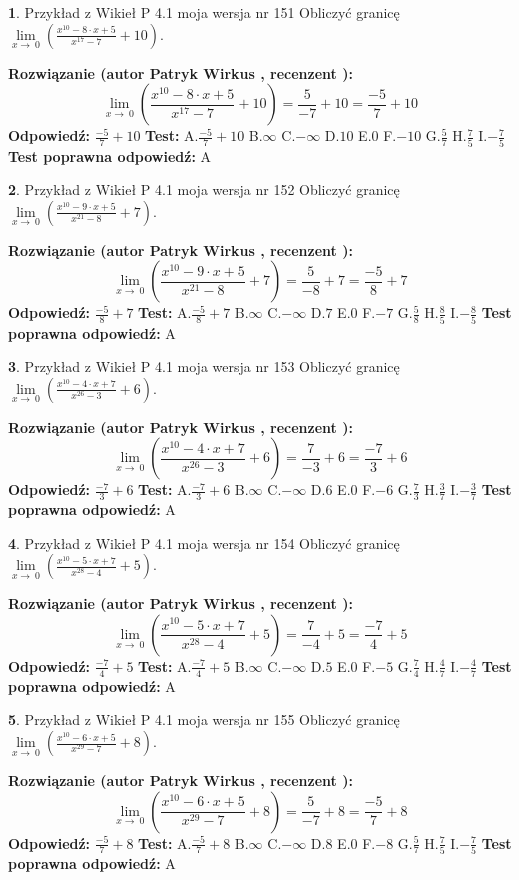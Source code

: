 \documentclass[12pt, a4paper]{article}
\theoremstyle{definition} %
\newtheorem{zad}{}
\newcommand{\zadStart}[1]{\begin{zad}#1\newline}
\newcommand{\zadStop}{\end{zad}}
\newcommand{\rozwStart}[2]{\noindent \textbf{Rozwiązanie (autor #1 , recenzent #2): }\newline}
\newcommand{\rozwStop}{\newline}
\newcommand{\odpStart}{\noindent \textbf{Odpowiedź:}\newline}
\newcommand{\odpStop}{\newline}
\newcommand{\testStart}{\noindent \textbf{Test:}\newline}
\newcommand{\testStop}{\newline}
\newcommand{\kluczStart}{\noindent \textbf{Test poprawna odpowiedź:}\newline}
\newcommand{\kluczStop}{\newline}
\begin{document}
\zadStart{Przykład z Wikieł P 4.1 moja wersja nr 151}
Obliczyć granicę $\lim\limits_{x\to\ 0}(\frac{x^{10}-8 \cdot x +5}{x^{17}-7}+10)$.
\zadStop
\rozwStart{Patryk Wirkus}{}
$$\lim\limits_{x\to\ 0}(\frac{x^{10}-8 \cdot x +5}{x^{17}-7}+10)=\frac{5}{-7}+10=\frac{-5}{7}+10$$
\rozwStop
\odpStart
$\frac{-5}{7}+10$
\odpStop
\testStart
A.$\frac{-5}{7}+10$
B.$\infty$
C.$-\infty$
D.$10$
E.$0$
F.$-10$
G.$\frac{5}{7}$
H.$\frac{7}{5}$
I.$-\frac{7}{5}$
\testStop
\kluczStart
A
\kluczStop



\zadStart{Przykład z Wikieł P 4.1 moja wersja nr 152}
Obliczyć granicę $\lim\limits_{x\to\ 0}(\frac{x^{10}-9 \cdot x +5}{x^{21}-8}+7)$.
\zadStop
\rozwStart{Patryk Wirkus}{}
$$\lim\limits_{x\to\ 0}(\frac{x^{10}-9 \cdot x +5}{x^{21}-8}+7)=\frac{5}{-8}+7=\frac{-5}{8}+7$$
\rozwStop
\odpStart
$\frac{-5}{8}+7$
\odpStop
\testStart
A.$\frac{-5}{8}+7$
B.$\infty$
C.$-\infty$
D.$7$
E.$0$
F.$-7$
G.$\frac{5}{8}$
H.$\frac{8}{5}$
I.$-\frac{8}{5}$
\testStop
\kluczStart
A
\kluczStop



\zadStart{Przykład z Wikieł P 4.1 moja wersja nr 153}
Obliczyć granicę $\lim\limits_{x\to\ 0}(\frac{x^{10}-4 \cdot x +7}{x^{26}-3}+6)$.
\zadStop
\rozwStart{Patryk Wirkus}{}
$$\lim\limits_{x\to\ 0}(\frac{x^{10}-4 \cdot x +7}{x^{26}-3}+6)=\frac{7}{-3}+6=\frac{-7}{3}+6$$
\rozwStop
\odpStart
$\frac{-7}{3}+6$
\odpStop
\testStart
A.$\frac{-7}{3}+6$
B.$\infty$
C.$-\infty$
D.$6$
E.$0$
F.$-6$
G.$\frac{7}{3}$
H.$\frac{3}{7}$
I.$-\frac{3}{7}$
\testStop
\kluczStart
A
\kluczStop



\zadStart{Przykład z Wikieł P 4.1 moja wersja nr 154}
Obliczyć granicę $\lim\limits_{x\to\ 0}(\frac{x^{10}-5 \cdot x +7}{x^{28}-4}+5)$.
\zadStop
\rozwStart{Patryk Wirkus}{}
$$\lim\limits_{x\to\ 0}(\frac{x^{10}-5 \cdot x +7}{x^{28}-4}+5)=\frac{7}{-4}+5=\frac{-7}{4}+5$$
\rozwStop
\odpStart
$\frac{-7}{4}+5$
\odpStop
\testStart
A.$\frac{-7}{4}+5$
B.$\infty$
C.$-\infty$
D.$5$
E.$0$
F.$-5$
G.$\frac{7}{4}$
H.$\frac{4}{7}$
I.$-\frac{4}{7}$
\testStop
\kluczStart
A
\kluczStop



\zadStart{Przykład z Wikieł P 4.1 moja wersja nr 155}
Obliczyć granicę $\lim\limits_{x\to\ 0}(\frac{x^{10}-6 \cdot x +5}{x^{29}-7}+8)$.
\zadStop
\rozwStart{Patryk Wirkus}{}
$$\lim\limits_{x\to\ 0}(\frac{x^{10}-6 \cdot x +5}{x^{29}-7}+8)=\frac{5}{-7}+8=\frac{-5}{7}+8$$
\rozwStop
\odpStart
$\frac{-5}{7}+8$
\odpStop
\testStart
A.$\frac{-5}{7}+8$
B.$\infty$
C.$-\infty$
D.$8$
E.$0$
F.$-8$
G.$\frac{5}{7}$
H.$\frac{7}{5}$
I.$-\frac{7}{5}$
\testStop
\kluczStart
A
\kluczStop
\end{document}
